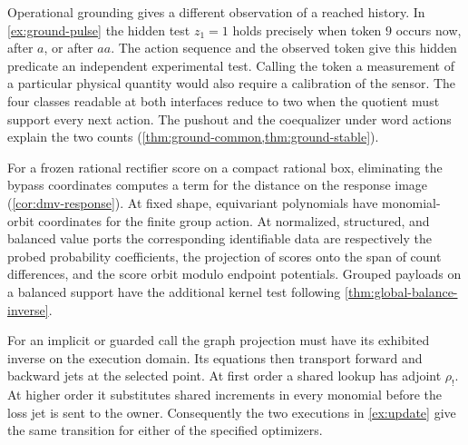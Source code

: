\documentclass[11pt,a4paper]{article}
\theoremstyle{definition}
\theoremstyle{remark}\newaliascnt{remark}{theorem}
\numberwithin{equation}{section}
\begin{document}
Operational grounding gives a different observation of a reached history. In \cref{ex:ground-pulse} the hidden test $z_1=1$ holds precisely when token $9$ occurs now, after $a$, or after $aa$. The action sequence and the observed token give this hidden predicate an independent experimental test. Calling the token a measurement of a particular physical quantity would also require a calibration of the sensor. The four classes readable at both interfaces reduce to two when the quotient must support every next action. The pushout and the coequalizer under word actions explain the two counts (\cref{thm:ground-common,thm:ground-stable}).

For a frozen rational rectifier score on a compact rational box, eliminating the bypass coordinates computes a term for the distance on the response image (\cref{cor:dmv-response}). At fixed shape, equivariant polynomials have monomial-orbit coordinates for the finite group action. At normalized, structured, and balanced value ports the corresponding identifiable data are respectively the probed probability coefficients, the projection of scores onto the span of count differences, and the score orbit modulo endpoint potentials. Grouped payloads on a balanced support have the additional kernel test following \cref{thm:global-balance-inverse}.

For an implicit or guarded call the graph projection must have its exhibited inverse on the execution domain. Its equations then transport forward and backward jets at the selected point. At first order a shared lookup has adjoint \(\rho_!\). At higher order it substitutes shared increments in every monomial before the loss jet is sent to the owner. Consequently the two executions in \cref{ex:update} give the same transition for either of the specified optimizers.
\end{document}
